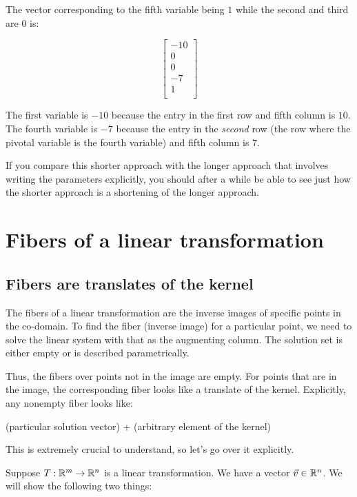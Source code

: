 \documentclass[10pt]{amsart}
\begin{document}
The vector corresponding to the fifth variable being $1$ while the
second and third are $0$ is:

$$\left[\begin{matrix} -10 \\ 0 \\ 0 \\ -7 \\ 1 \\\end{matrix}\right]$$

The first variable is $-10$ because the entry in the first row and
fifth column is $10$. The fourth variable is $-7$ because the entry in
the {\em second} row (the row where the pivotal variable is the fourth
variable) and fifth column is $7$.

If you compare this shorter approach with the longer approach that
involves writing the parameters explicitly, you should after a while
be able to see just how the shorter approach is a shortening of the
longer approach.

\section{Fibers of a linear transformation}

\subsection{Fibers are translates of the kernel}

The fibers of a linear transformation are the inverse images of
specific points in the co-domain. To find the fiber (inverse image)
for a particular point, we need to solve the linear system with that
as the augmenting column. The solution set is either empty or is
described parametrically.

Thus, the fibers over points not in the image are empty. For points
that are in the image, the corresponding fiber looks like a translate
of the kernel. Explicitly, any nonempty fiber looks like:

(particular solution vector) + (arbitrary element of the kernel)

This is extremely crucial to understand, so let's go over it
explicitly.

Suppose $T: \mathbb{R}^m \to \mathbb{R}^n$ is a linear transformation. We have a
vector $\vec{v} \in \mathbb{R}^n$. We will show the following two things:
\end{document}
